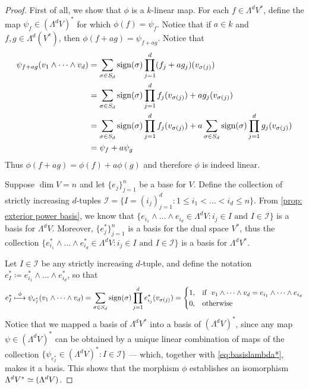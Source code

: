 \begin{proof}
    First of all, we show that \(\phi\) is a \(k\)-linear map. For each \(f \in
    \Lambda^d V^{*}\), define the map \(\psi_{f} \in (\Lambda^dV)^{*}\) for which
    \(\phi(f) = \psi_f\). Notice that if \(a \in k\) and \(f, g \in
    \Lambda^d(V^{*})\), then \(\phi(f + a g) = \psi_{f + a g}\). Notice that
    \begin{align*}
        \psi_{f + ag}(v_1 \wedge \dots \wedge v_d)
         & = \sum_{\sigma \in S_d} \operatorname{sign}(\sigma)
        \prod_{j=1}^d (f_{j} + a g_{j})(v_{\sigma(j)})                            \\
         & = \sum_{\sigma \in S_d} \operatorname{sign}(\sigma)
        \prod_{j=1}^d f_j(v_{\sigma(j)}) + a g_j(v_{\sigma(j)})                   \\
         & = \sum_{\sigma \in S_d} \operatorname{sign}(\sigma) \prod_{j=1}^d f_j(v_{\sigma(j)})
        + a \sum_{\sigma \in S_d} \operatorname{sign}(\sigma) \prod_{j=1}^d g_j(v_{\sigma(j)})  \\
         & = \psi_f + a \psi_g
    \end{align*}
    Thus \(\phi(f + ag) = \phi(f) + a \phi(g)\) and therefore \(\phi\) is indeed
    linear.

    Suppose \(\dim V = n\) and let \(\{e_{j}\}_{j=1}^n\) be a base for \(V\). Define
    the collection of strictly increasing \(d\)-tuples \(\mathcal I = \{I =
    (i_{j})_{j=1}^d \colon 1 \leq i_1 < \dots < i_d \leq n\}\). From \cref{prop: exterior
        power basis}, we know that \(\{e_{i_{1}} \wedge \dots \wedge e_{i_{d}} \in
    \Lambda^d V \colon i_j \in I \text{ and } I \in \mathcal I\}\) is a basis for
    \(\Lambda^d V\). Moreover, \(\{e_{j}^{*}\}_{j=1}^n\) is a basis for the dual
    space \(V^{*}\), thus the collection \(\{e_{i_{1}}^{*} \wedge \dots \wedge
    e_{i_{d}}^{*} \in \Lambda^d V \colon i_j \in I \text{ and } I \in \mathcal I\}\) is a
    basis for \(\Lambda^d V^{*}\).

    Let \(I \in \mathcal I\) be any strictly increasing \(d\)-tuple, and define the
    notation \(e_I^{*} \coloneq e_{i_1}^{*} \wedge \dots \wedge e_{i_d}^{*}\), so
    that
    \begin{equation}
        \label{eq:basislambda*}
        e_I^{*} \overset{\phi}\longmapsto
        \psi_{e_I^{*}}(v_1 \wedge \dots \wedge v_d)
        = \sum_{\sigma \in S_{d}} \operatorname{sign}(\sigma) \prod_{j=1}^d e_{i_j}^{*}(v_{\sigma(j)}) =
        \begin{cases}
            1, & \text{if }\ v_1 \wedge \dots \wedge v_d
            = e_{i_1} \wedge \dots \wedge e_{i_d}        \\
            0, & \text{otherwise}
        \end{cases}
    \end{equation}
    Notice that we mapped a basis of \(\Lambda^d V^{*}\) into a basis of
    \((\Lambda^d V)^{*}\), since any map \(\psi \in (\Lambda^d V)^{*}\) can be
    obtained by a unique linear combination of maps of the collection
    \(\{\psi_{e_{I}^{*}} \in (\Lambda^d V)^{*} \colon I \in \mathcal I\}\) --- which,
    together with \cref{eq:basislambda*}, makes it a basis. This shows that the
    morphism \(\phi\) establishes an isomorphism \(\Lambda^dV^{*} \simeq (\Lambda^d
    V)\).
\end{proof}

